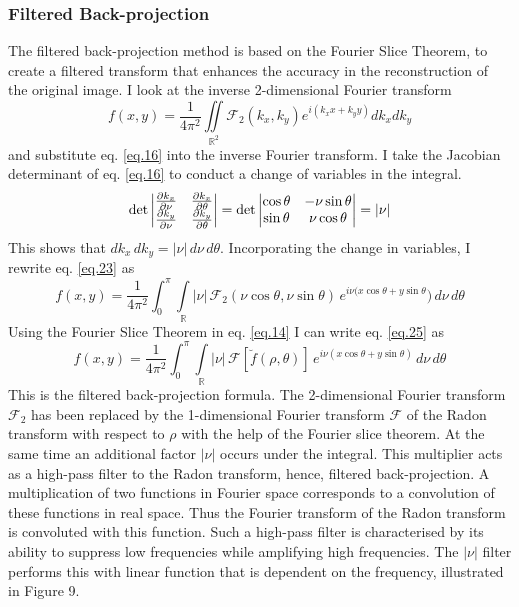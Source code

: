 \documentclass[12pt]{article}
\begin{document}
\subsubsection{Filtered Back-projection}
The filtered back-projection method is based on the Fourier Slice Theorem, to create a filtered transform that enhances the accuracy in the reconstruction of the original image.  
I look at the inverse 2-dimensional Fourier transform
\begin{equation}\label{eq.23}
	f(x,y) = \frac{1}{4\pi^2}\iint\limits_{\mathbb{R}^2} \mathcal{F}_2(k_x, k_y) e^{i(k_x x + k_y y)} dk_x dk_y
\end{equation}
and substitute eq. \ref{eq.16} into the inverse Fourier transform. I take the Jacobian determinant of eq. \ref{eq.16} to conduct a change of variables in the integral.
\begin{equation}\label{eq.24}
	\rm{det}\begin{vmatrix}
\frac{\partial k_x}{\partial \nu} & \frac{\partial k_x}{\partial \theta} \\
\frac{\partial k_y}{\partial \nu} & \frac{\partial k_y}{\partial \theta} \\
\end{vmatrix}
= 
\rm{det}\begin{vmatrix}
\cos{\theta} & -\nu\sin{\theta} \\
\sin{\theta} & \nu\cos{\theta} \\
\end{vmatrix}
= |\nu|
\end{equation}
This shows that $dk_x \, dk_y = |\nu|\,d\nu \,d\theta$. Incorporating the change in variables, I rewrite eq. \ref{eq.23} as
\begin{equation}\label{eq.25}
	f(x,y) = \frac{1}{4\pi^2}\int_{0}^{\pi} \int\limits_{\mathbb{R}}|\nu|\,\mathcal{F}_2(\nu\cos{\theta}, \nu\sin{\theta})\, e^{i\nu(x\cos{\theta}+y\sin{\theta}})\,d\nu\,d\theta
\end{equation}
Using the Fourier Slice Theorem in eq. \ref{eq.14} I can write eq. \ref{eq.25} as
\begin{equation}\label{eq.26}
	f(x,y) = \frac{1}{4\pi^2}\int_{0}^{\pi} \int\limits_{\mathbb{R}}|\nu|\,\mathcal{F}[\breve{f}(\rho, \theta)]\, e^{i\nu(x\cos{\theta}+y\sin{\theta})}\,d\nu\,d\theta
\end{equation}
This is the filtered back-projection formula. The 2-dimensional Fourier transform $\mathcal{F}_{2}$ has been replaced by the 1-dimensional Fourier transform $\mathcal{F}$ of the Radon transform with respect to $\rho$ with the help of the Fourier slice theorem. At the same time an additional factor $|\nu|$ occurs under the integral. This multiplier acts as a high-pass filter to the Radon transform, hence, filtered back-projection. A multiplication of two functions in Fourier space corresponds to a convolution of these functions in real space. Thus the Fourier transform of the Radon transform is convoluted with this function. Such a high-pass filter is characterised by its ability to suppress low frequencies while amplifying high frequencies. The $|\nu|$ filter performs this with linear function that is dependent on the frequency, illustrated in Figure 9.
\end{document}
